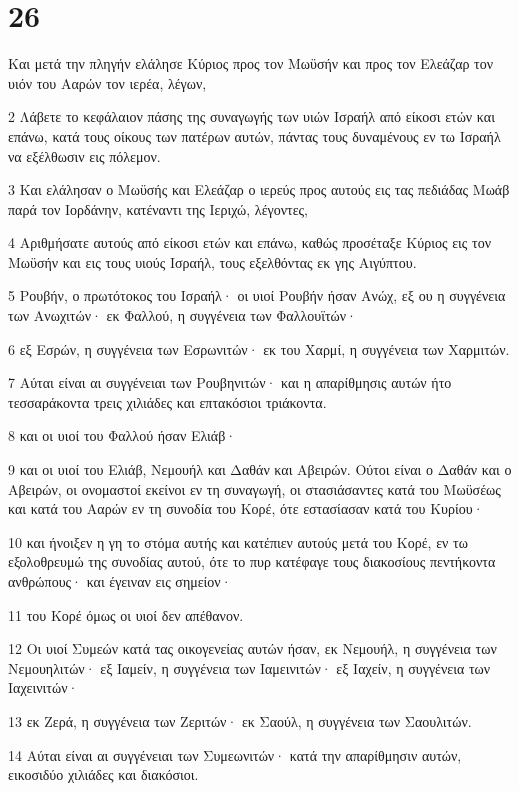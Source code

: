 \chapter{26}

\par Και μετά την πληγήν ελάλησε Κύριος προς τον Μωϋσήν και προς τον Ελεάζαρ τον υιόν του Ααρών τον ιερέα, λέγων,
\par 2 Λάβετε το κεφάλαιον πάσης της συναγωγής των υιών Ισραήλ από είκοσι ετών και επάνω, κατά τους οίκους των πατέρων αυτών, πάντας τους δυναμένους εν τω Ισραήλ να εξέλθωσιν εις πόλεμον.
\par 3 Και ελάλησαν ο Μωϋσής και Ελεάζαρ ο ιερεύς προς αυτούς εις τας πεδιάδας Μωάβ παρά τον Ιορδάνην, κατέναντι της Ιεριχώ, λέγοντες,
\par 4 Αριθμήσατε αυτούς από είκοσι ετών και επάνω, καθώς προσέταξε Κύριος εις τον Μωϋσήν και εις τους υιούς Ισραήλ, τους εξελθόντας εκ γης Αιγύπτου.
\par 5 Ρουβήν, ο πρωτότοκος του Ισραήλ· οι υιοί Ρουβήν ήσαν Ανώχ, εξ ου η συγγένεια των Ανωχιτών· εκ Φαλλού, η συγγένεια των Φαλλουϊτών·
\par 6 εξ Εσρών, η συγγένεια των Εσρωνιτών· εκ του Χαρμί, η συγγένεια των Χαρμιτών.
\par 7 Αύται είναι αι συγγένειαι των Ρουβηνιτών· και η απαρίθμησις αυτών ήτο τεσσαράκοντα τρεις χιλιάδες και επτακόσιοι τριάκοντα.
\par 8 και οι υιοί του Φαλλού ήσαν Ελιάβ·
\par 9 και οι υιοί του Ελιάβ, Νεμουήλ και Δαθάν και Αβειρών. Ούτοι είναι ο Δαθάν και ο Αβειρών, οι ονομαστοί εκείνοι εν τη συναγωγή, οι στασιάσαντες κατά του Μωϋσέως και κατά του Ααρών εν τη συνοδία του Κορέ, ότε εστασίασαν κατά του Κυρίου·
\par 10 και ήνοιξεν η γη το στόμα αυτής και κατέπιεν αυτούς μετά του Κορέ, εν τω εξολοθρευμώ της συνοδίας αυτού, ότε το πυρ κατέφαγε τους διακοσίους πεντήκοντα ανθρώπους· και έγειναν εις σημείον·
\par 11 του Κορέ όμως οι υιοί δεν απέθανον.
\par 12 Οι υιοί Συμεών κατά τας οικογενείας αυτών ήσαν, εκ Νεμουήλ, η συγγένεια των Νεμουηλιτών· εξ Ιαμείν, η συγγένεια των Ιαμεινιτών· εξ Ιαχείν, η συγγένεια των Ιαχεινιτών·
\par 13 εκ Ζερά, η συγγένεια των Ζεριτών· εκ Σαούλ, η συγγένεια των Σαουλιτών.
\par 14 Αύται είναι αι συγγένειαι των Συμεωνιτών· κατά την απαρίθμησιν αυτών, εικοσιδύο χιλιάδες και διακόσιοι.
